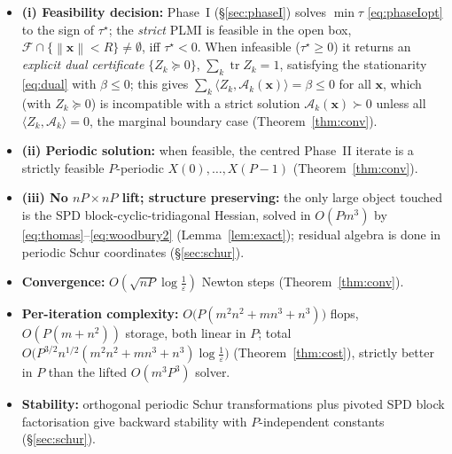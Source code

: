 \documentclass{amsart}
\newcommand{\tr}{\operatorname{tr}}
\newcommand{\norm}[1]{\left\lVert#1\right\rVert}
\begin{document}
\begin{itemize}
\item \textbf{(i) Feasibility decision:} Phase~I (\S\ref{sec:phaseI}) solves
$\min\tau$ \eqref{eq:phaseIopt} to the sign of $\tau^\star$;
the \emph{strict} PLMI is feasible in the open box, $\mathcal F\cap\{\norm{\bm x}<R\}
\neq\emptyset$, iff $\tau^\star<0$. When infeasible ($\tau^\star\ge0$) it returns an
\emph{explicit dual certificate} $\{Z_k\succeq0\}$, $\sum_k\tr Z_k=1$, satisfying the
stationarity \eqref{eq:dual} with $\beta\le0$; this gives $\sum_k\langle Z_k,\mathcal
A_k(\bm x)\rangle=\beta\le0$ for all $\bm x$, which (with $Z_k\succeq0$) is
incompatible with a strict solution $\mathcal A_k(\bm x)\succ0$ unless all
$\langle Z_k,\mathcal A_k\rangle=0$, the marginal boundary case
(Theorem~\ref{thm:conv}).
\item \textbf{(ii) Periodic solution:} when feasible, the centred Phase~II iterate is
a strictly feasible $P$-periodic $X(0),\dots,X(P-1)$ (Theorem~\ref{thm:conv}).
\item \textbf{(iii) No $nP\times nP$ lift; structure preserving:} the only large
object touched is the SPD block-cyclic-tridiagonal Hessian, solved in $O(Pm^3)$ by
\eqref{eq:thomas}--\eqref{eq:woodbury2} (Lemma~\ref{lem:exact}); residual algebra is
done in periodic Schur coordinates (\S\ref{sec:schur}).
\item \textbf{Convergence:} $O(\sqrt{nP}\log\frac1\varepsilon)$ Newton steps
(Theorem~\ref{thm:conv}).
\item \textbf{Per-iteration complexity:} $O\!\big(P(m^2n^2+mn^3+n^3)\big)$ flops,
$O(P(m+n^2))$ storage, both linear in $P$; total
$O\!\big(P^{3/2}n^{1/2}(m^2n^2+mn^3+n^3)\log\frac1\varepsilon\big)$
(Theorem~\ref{thm:cost}), strictly better in $P$ than the lifted $O(m^3P^3)$ solver.
\item \textbf{Stability:} orthogonal periodic Schur transformations plus pivoted SPD
block factorisation give backward stability with $P$-independent constants
(\S\ref{sec:schur}).
\end{itemize}
\end{document}
